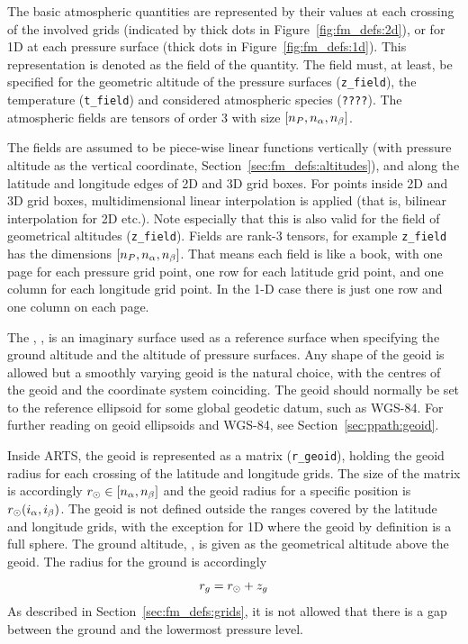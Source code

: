 The basic atmospheric quantities are represented by their values at
each crossing of the involved grids (indicated by thick dots in
Figure~\ref{fig:fm_defs:2d}), or for 1D at each pressure surface
(thick dots in Figure~\ref{fig:fm_defs:1d}). This representation is
denoted as the field of the quantity. The
field must, at least, be specified for the geometric altitude of the
pressure surfaces (\verb|z_field|), the temperature (\verb|t_field|)
and considered atmospheric species (\verb|????|). The atmospheric
fields are tensors of order 3 with size
$[n_{P},n_{\alpha},n_{\beta}]$.

The fields are assumed to be piece-wise linear functions vertically
(with pressure altitude as the vertical coordinate,
Section~\ref{sec:fm_defs:altitudes}), and along the latitude and
longitude edges of 2D and 3D grid boxes. For points inside 2D and 3D
grid boxes, multidimensional linear interpolation is applied (that is,
bilinear interpolation for 2D etc.). Note especially that this is also
valid for the field of geometrical altitudes (\verb|z_field|).  Fields
are rank-3 tensors, for example \verb|z_field| has the dimensions
$[n_{P},n_{\alpha},n_{\beta}]$.  That means each
field is like a book, with one page for each pressure grid point, one
row for each latitude grid point, and one column for each longitude
grid point. In the 1-D case there is just one row and one column on each
page.



\label{sec:fm_defs:geoid}

The , \aRds{\odot}, is an imaginary surface used as a
reference surface when specifying the ground altitude and the altitude
of pressure surfaces. Any shape of the geoid is allowed but a smoothly
varying geoid is the natural choice, with the centres of the geoid and
the coordinate system coinciding. The geoid should normally be set to
the reference ellipsoid for some global geodetic datum, such as
WGS-84. For further reading on geoid ellipsoids and WGS-84, see
Section~\ref{sec:ppath:geoid}.

Inside ARTS, the geoid is represented as a matrix (\verb|r_geoid|),
holding the geoid radius for each crossing of the latitude and
longitude grids. The size of the matrix is accordingly $r_{\odot}
\in [n_{\alpha},n_{\beta}]$ and the geoid radius for a
specific position is $r_{\odot}(i_{\alpha},i_{\beta})$. The
geoid is not defined outside the ranges covered by the latitude and
longitude grids, with the exception for 1D where the geoid by
definition is a full sphere. 
The ground altitude, , is given as the geometrical altitude
above the geoid. The radius for the ground is accordingly
\begin{equation}
  r_{g} = r_{\odot} + z_{g}
 \label{eq:fm_defs:zground}
\end{equation}
As described in
Section~\ref{sec:fm_defs:grids}, it is not allowed that there is a gap
between the ground and the lowermost pressure level.

